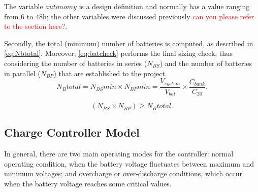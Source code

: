 \documentclass[journal]{IEEEtran}
\begin{document}
The variable $autonomy$ is a design definition and normally has a value ranging from $6$ to $48$h; the other variables were discussed previously \textcolor{red}{can you please refer to the section here?}.

Secondly, the total (minimum) number of batteries is computed, as described in \eqref{eq:Nbtotal}. Moreover, \eqref{eq:batcheck} performs the final sizing check, thus considering the number of batteries in series ($ N_{BS} $) and the number of batteries in parallel ($ N_{BP} $) that are established to the project.
\begin{equation}
\label{eq:Nbtotal}
N_{B}total = N_{BS}min \times N_{BP}min = \dfrac{V_{system}}{V_{bat}} \times \dfrac{C_{bank}}{C_{20}}.
\end{equation}

\begin{equation}
\label{eq:batcheck}
\left( N_{BS} \times  N_{BP} \right) \geq N_{B}total.
\end{equation}

\subsection{Charge Controller Model}


%
%
%
%
In general, there are two main operating modes for the controller: normal operating condition, when the battery voltage fluctuates between maximum and minimum voltages; and overcharge or over-discharge conditions, which occur when the battery voltage reaches some critical values. 
\end{document}
